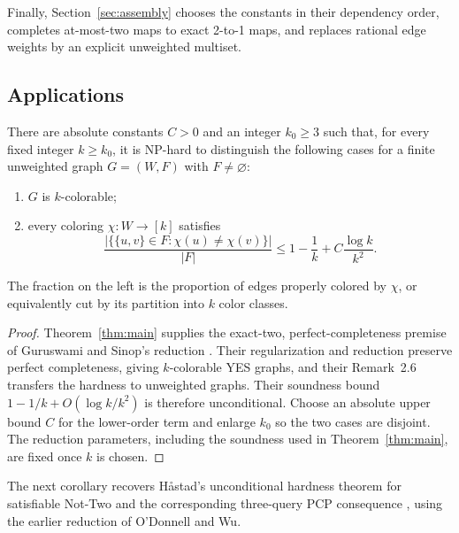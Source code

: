 Finally, Section~\ref{sec:assembly} chooses the constants in their dependency
order, completes at-most-two maps to exact 2-to-1 maps, and replaces rational
edge weights by an explicit unweighted multiset.

\subsection{Applications}

\begin{corollary}\label{cor:max-k-colorable}
There are absolute constants $C>0$ and an integer $k_0\ge3$ such that, for
every fixed integer $k\ge k_0$, it is NP-hard to distinguish the following
cases for a finite unweighted graph $G=(W,F)$ with $F\ne\varnothing$:
\begin{enumerate}[label=\textup{(\roman*)}]
\item $G$ is $k$-colorable;
\item every coloring $\chi:W\to[k]$ satisfies
\[
 \frac{|\{\{u,v\}\in F:\chi(u)\ne\chi(v)\}|}{|F|}
 \le 1-\frac1k+C\frac{\log k}{k^2}.
\]
\end{enumerate}
The fraction on the left is the proportion of edges properly colored by
$\chi$, or equivalently cut by its partition into $k$ color classes.
\end{corollary}
\begin{proof}
Theorem~\ref{thm:main} supplies the exact-two, perfect-completeness premise
of Guruswami and Sinop's reduction
\cite[Conjecture~3.4 and Theorem~3.26]{GuruswamiSinop2013}.
Their regularization and reduction preserve perfect completeness, giving
$k$-colorable YES graphs, and their Remark~2.6 transfers the hardness to
unweighted graphs. Their soundness bound
$1-1/k+O(\log k/k^2)$ is therefore unconditional. Choose an absolute
upper bound $C$ for the lower-order term and enlarge $k_0$ so the two
cases are disjoint. The reduction parameters, including the soundness
used in Theorem~\ref{thm:main}, are fixed once $k$ is chosen.
\end{proof}

The next corollary recovers H{\aa}stad's unconditional hardness theorem
for satisfiable Not-Two and the corresponding three-query PCP consequence
\cite[Theorem~4.3]{Hastad2014NotTwo}, using the earlier reduction of
O'Donnell and Wu.

